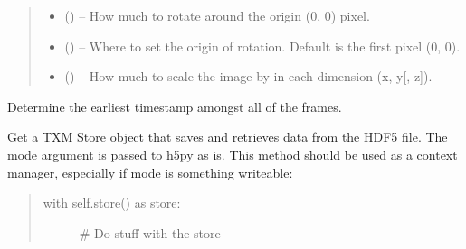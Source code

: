 \documentclass[letterpaper,10pt,english]{sphinxmanual}
\begin{document}
\begin{fulllineitems}
\begin{fulllineitems}
\begin{quote}
\begin{description}
\begin{itemize}
\item {} 
 () -- How much to rotate around the origin (0, 0) pixel.

\item {} 
 () -- Where to set the origin of rotation. Default is the first
pixel (0, 0).

\item {} 
 () -- How much to scale the image by in each dimension (x, y{[},
z{]}).

\end{itemize}

\end{description}\end{quote}

\end{fulllineitems}


\begin{fulllineitems}
\label{\detokenize{xanespy:xanespy.xanes_frameset.XanesFrameset.starttime}}
Determine the earliest timestamp amongst all of the frames.

\end{fulllineitems}


\begin{fulllineitems}
\label{\detokenize{xanespy:xanespy.xanes_frameset.XanesFrameset.store}}
Get a TXM Store object that saves and retrieves data from the HDF5
file. The mode argument is passed to h5py as is. This method
should be used as a context manager, especially if mode is
something writeable:
\begin{quote}
\begin{description}
\item[{with self.store() as store:}] \leavevmode
\# Do stuff with the store

\end{description}
\end{quote}

\end{fulllineitems}


\end{fulllineitems}
\end{document}
